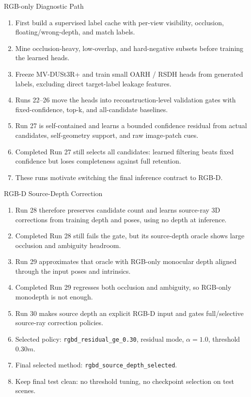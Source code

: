 \begin{frame}{RGB-only Diagnostic Path}
  \footnotesize
  \begin{enumerate}
    \item First build a supervised label cache with per-view visibility,
    occlusion, floating/wrong-depth, and match labels.
    \item Mine occlusion-heavy, low-overlap, and hard-negative subsets before
    training the learned heads.
    \item Freeze MV-DUSt3R+ and train small OARH / RSDH heads from generated
    labels, excluding direct target-label leakage features.
    \item Runs 22--26 move the heads into reconstruction-level validation gates
    with fixed-confidence, top-k, and all-candidate baselines.
    \item Run 27 is self-contained and learns a bounded confidence residual
    from actual candidates, self-geometry support, and raw image-patch cues.
    \item Completed Run 27 still selects all candidates: learned filtering beats
    fixed confidence but loses completeness against full retention.
    \item These runs motivate switching the final inference contract to RGB-D.
  \end{enumerate}
\end{frame}

\begin{frame}{RGB-D Source-Depth Correction}
  \footnotesize
  \begin{enumerate}
    \item Run 28 therefore preserves candidate count and learns source-ray
    3D corrections from training depth and poses, using no depth at inference.
    \item Completed Run 28 still fails the gate, but its source-depth oracle
    shows large occlusion and ambiguity headroom.
    \item Run 29 approximates that oracle with RGB-only monocular depth aligned
    through the input poses and intrinsics.
    \item Completed Run 29 regresses both occlusion and ambiguity, so RGB-only
    monodepth is not enough.
    \item Run 30 makes source depth an explicit RGB-D input and gates
    full/selective source-ray correction policies.
    \item Selected policy: \texttt{rgbd\_residual\_ge\_0.30}, residual mode,
    \(\alpha = 1.0\), threshold \(0.30m\).
    \item Final selected method: \texttt{rgbd\_source\_depth\_selected}.
    \item Keep final test clean: no threshold tuning, no checkpoint selection
    on test scenes.
  \end{enumerate}
\end{frame}
